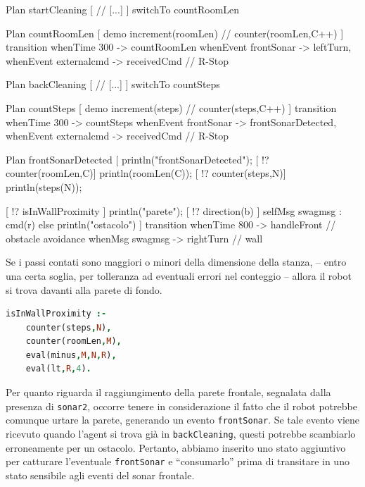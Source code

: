 \documentclass{../llncs}
\newcommand{\codescript}[1]{{\mbox{\small{\texttt{#1}}}}\xspace}
\newcommand{\code}[1]{{\color{blue}\small{\texttt{#1}}}}
\begin{document}
\begin{qacode}[caption={SoftwareAgent, pt12}]
Plan startCleaning [
	// [...]
]
switchTo countRoomLen

Plan countRoomLen [
	demo increment(roomLen) // counter(roomLen,C++)
]
transition
	whenTime 300 -> countRoomLen
	whenEvent frontSonar -> leftTurn,
	whenEvent externalcmd -> receivedCmd // R-Stop
	
Plan backCleaning [
	// [...]
]
switchTo countSteps

Plan countSteps [
	demo increment(steps) // counter(steps,C++)
]
transition
	whenTime 300 -> countSteps
	whenEvent frontSonar -> frontSonarDetected,
	whenEvent externalcmd -> receivedCmd // R-Stop
	
Plan frontSonarDetected [
	println("frontSonarDetected");
	[ !? counter(roomLen,C)] println(roomLen(C));
	[ !? counter(steps,N)] println(steps(N));
	
	[ !? isInWallProximity ] {
		println("parete");
		[ !? direction(b) ] selfMsg swagmsg : cmd(r)
	}
	else
		println("ostacolo")
]
transition
	whenTime 800 -> handleFront // obstacle avoidance
	whenMsg swagmsg -> rightTurn // wall
\end{qacode}

Se i passi contati sono maggiori o minori della dimensione della stanza, -- entro una certa soglia, per tolleranza ad eventuali errori nel conteggio -- allora il robot si trova davanti alla parete di fondo.\\

\begin{lstlisting}[language=Prolog, keywordstyle=\color{black}, caption={SoftwareAgent, Rules - pt4}]
isInWallProximity :-
	counter(steps,N),
	counter(roomLen,M),
	eval(minus,M,N,R),
	eval(lt,R,4).
\end{lstlisting}

Per quanto riguarda il raggiungimento della parete frontale, segnalata dalla presenza di \code{sonar2}, occorre tenere in considerazione il fatto che il robot potrebbe comunque urtare la parete, generando un evento \codescript{frontSonar}. Se tale evento viene ricevuto quando l'agent si trova già in \codescript{backCleaning}, questi potrebbe scambiarlo erroneamente per un ostacolo. Pertanto, abbiamo inserito uno stato aggiuntivo per catturare l'eventuale \codescript{frontSonar} e ``consumarlo'' prima di transitare in uno stato sensibile agli eventi del sonar frontale.\\
\end{document}
